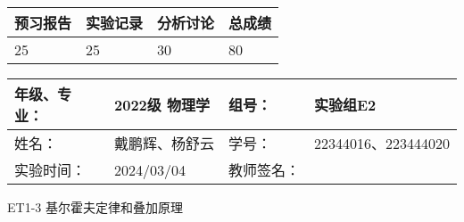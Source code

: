 \documentclass[dvipsnames, svgnames,a4paper,11pt]{article}
\begin{document}
	
	
	
	
	\begin{table}
		\renewcommand\arraystretch{1.7}
		\begin{tabularx}{\textwidth}{
				|X|X|X|X
				|X|X|X|X|}
			\hline
			\multicolumn{2}{|c|}{预习报告}&\multicolumn{2}{|c|}{实验记录}&\multicolumn{2}{|c|}{分析讨论}&\multicolumn{2}{|c|}{总成绩}\\
			\hline
			\LARGE25 & & \LARGE25 & & \LARGE30 & & \LARGE80 & \\
			\hline
		\end{tabularx}
	\end{table}
	
	\begin{table}
		\renewcommand\arraystretch{1.7}
		\begin{tabularx}{\textwidth}{|X|X|X|X|}
			\hline
			年级、专业： & 2022级 物理学 &组号： & 实验组E2\\
			\hline
			姓名： & 戴鹏辉、杨舒云  & 学号： & 22344016、223444020\\
			\hline
			实验时间： & 2024/03/04 & 教师签名： & \\
			\hline
		\end{tabularx}
	\end{table}
	
	\begin{center}
		\LARGE ET1-3 \quad 基尔霍夫定律和叠加原理
	\end{center}
	
	
\end{document}
